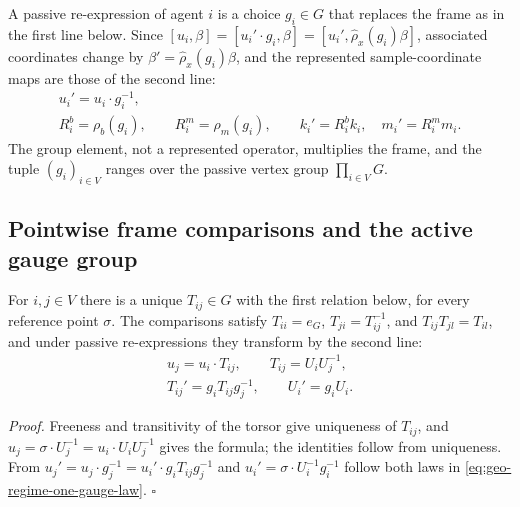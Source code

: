 A passive re-expression of agent $i$ is a choice $g_i\in G$ that replaces the frame as in the first
line below. Since $[u_i,\beta]=[u_i'\cdot g_i,\beta]=[u_i',\widehat\rho_x(g_i)\beta]$, associated
coordinates change by $\beta'=\widehat\rho_x(g_i)\beta$, and the represented sample-coordinate maps are
those of the second line:
\begin{gather}
u_i'=u_i\cdot g_i^{-1},
\label{eq:geo-local-reframing}\\
R_i^b=\rho_b(g_i),
\qquad
R_i^m=\rho_m(g_i),
\qquad
k_i'=R_i^bk_i,\quad m_i'=R_i^mm_i.
\label{eq:geo-represented-frame-change}
\end{gather}
The group element, not a represented operator, multiplies the frame, and the tuple $(g_i)_{i\in V}$
ranges over the passive vertex group $\prod_{i\in V}G$.

\subsection{Pointwise frame comparisons and the active gauge group}
\label{sec:geo-regime-one}

For $i,j\in V$ there is a unique $T_{ij}\in G$ with the first relation below, for every reference
point $\sigma$. The comparisons satisfy $T_{ii}=e_G$, $T_{ji}=T_{ij}^{-1}$, and $T_{ij}T_{jl}=T_{il}$,
and under passive re-expressions they transform by the second line:
\begin{gather}
u_j=u_i\cdot T_{ij},
\qquad
T_{ij}=U_iU_j^{-1},
\label{eq:geo-frame-comparison}\\
T_{ij}'=g_iT_{ij}g_j^{-1},
\qquad
U_i'=g_iU_i.
\label{eq:geo-regime-one-gauge-law}
\end{gather}

\noindent\emph{Proof.}
Freeness and transitivity of the torsor give uniqueness of $T_{ij}$, and
$u_j=\sigma\cdot U_j^{-1}=u_i\cdot U_iU_j^{-1}$ gives the formula; the identities follow from
uniqueness. From $u_j'=u_j\cdot g_j^{-1}=u_i'\cdot g_iT_{ij}g_j^{-1}$ and
$u_i'=\sigma\cdot U_i^{-1}g_i^{-1}$ follow both laws in \eqref{eq:geo-regime-one-gauge-law}.
\hfill$\square$

